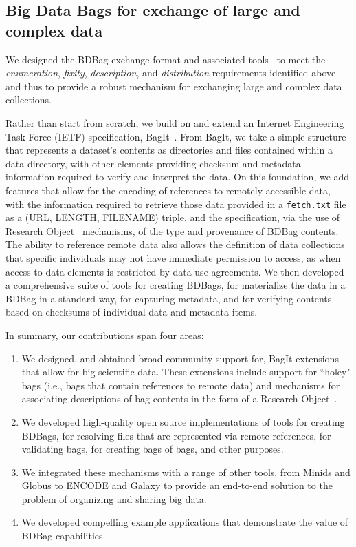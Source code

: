 \documentclass[11pt]{article}
\begin{document}
\subsection{Big Data Bags for exchange of large and complex data}

We designed the BDBag exchange format and associated tools~\cite{chard16} to meet the \emph{enumeration}, \emph{fixity}, \emph{description}, and \emph{distribution} requirements identified above
and thus to provide a robust mechanism for exchanging large and complex data collections.

Rather than start from scratch, we build on and extend an Internet Engineering Task Force (IETF) specification,
BagIt~\cite{Kunze2015}.
From BagIt, we take a simple structure that represents a dataset's contents as directories and files contained within a data directory,
with other elements providing checksum and metadata information required to verify and interpret the data. 
On this foundation, we add features that allow for the encoding of references to remotely accessible data, with the information required to retrieve those data provided in a \texttt{fetch.txt} file as a (URL, LENGTH, FILENAME) triple, and the specification, via the use of Research Object~\cite{bechhofer2013linked} mechanisms, 
of the type and provenance of BDBag contents.  
The ability to reference remote data also allows the definition of data collections that specific individuals may not have immediate permission to access, 
as when access to data elements is restricted by data use agreements.
We then developed a comprehensive suite of tools for creating BDBags, for
materialize the data in a BDBag in a standard way, for capturing metadata, 
and for verifying contents based on checksums of individual data and metadata items.

In summary, our contributions span four areas:
\begin{enumerate}
\item
We designed, and obtained broad community support for, BagIt extensions that allow for big scientific data.
These extensions include support for
``holey" bags (i.e., bags that contain references to remote data)
and mechanisms for associating descriptions of bag contents in the form of a Research Object~\cite{bechhofer2013linked}.

\item
We developed high-quality open source implementations of tools for creating BDBags, 
for resolving files that are represented via remote references, for validating
bags, for creating bags of bags, and other purposes.

\item
We integrated these mechanisms with a range of other tools, 
from Minids and Globus to ENCODE and Galaxy 
to provide an end-to-end solution to the problem of organizing and sharing big data. 

\item
We developed compelling example applications that demonstrate the value of BDBag capabilities.

\end{enumerate}
\end{document}
